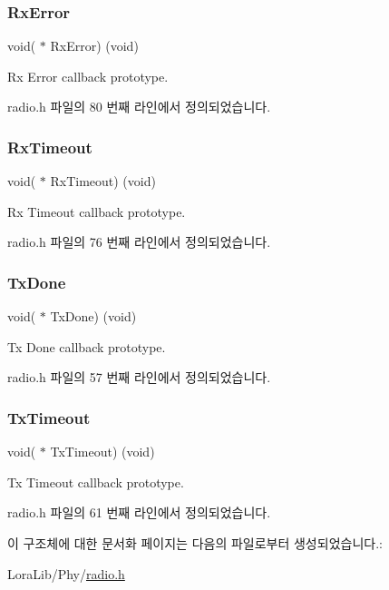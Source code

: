 \subsubsection{\texorpdfstring{Rx\+Error}{RxError}}
{\footnotesize\ttfamily void( $\ast$ Rx\+Error) (void)}



Rx Error callback prototype. 



radio.\+h 파일의 80 번째 라인에서 정의되었습니다.

\mbox{\label{struct_radio_events__t_a0baf0babc5416ab7f30e59e5afd3af7f}} 
\subsubsection{\texorpdfstring{Rx\+Timeout}{RxTimeout}}
{\footnotesize\ttfamily void( $\ast$ Rx\+Timeout) (void)}



Rx Timeout callback prototype. 



radio.\+h 파일의 76 번째 라인에서 정의되었습니다.

\mbox{\label{struct_radio_events__t_af3d5845be2b1d9298fec8aea76ac07aa}} 
\subsubsection{\texorpdfstring{Tx\+Done}{TxDone}}
{\footnotesize\ttfamily void( $\ast$ Tx\+Done) (void)}



Tx Done callback prototype. 



radio.\+h 파일의 57 번째 라인에서 정의되었습니다.

\mbox{\label{struct_radio_events__t_a869fb2c61e5aee8f8b104345d510e7f3}} 
\subsubsection{\texorpdfstring{Tx\+Timeout}{TxTimeout}}
{\footnotesize\ttfamily void( $\ast$ Tx\+Timeout) (void)}



Tx Timeout callback prototype. 



radio.\+h 파일의 61 번째 라인에서 정의되었습니다.



이 구조체에 대한 문서화 페이지는 다음의 파일로부터 생성되었습니다.\+:\begin{DoxyCompactItemize}
\item 
Lora\+Lib/\+Phy/\mbox{\hyperlink{radio_8h}{radio.\+h}}\end{DoxyCompactItemize}
